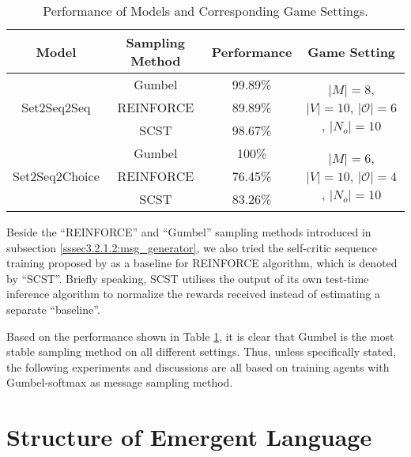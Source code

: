 \begin{table}[!h]
    \centering
    \begin{tabular}{|c|c|c|c|}
        \hline
        Model                           & Sampling Method & Performance & Game Setting      \\ \hline
        \multirow{3}{*}{Set2Seq2Seq}    & Gumbel          & 99.89\%     & \multirow{3}{1.5in}{$|M|=8$, $|V|=10$, $|\mathcal{O}|=6$, $|N_{o}|=10$} \\ \cline{2-3}
                                        & REINFORCE       & 89.89\%     &                   \\ \cline{2-3}
                                        & SCST            & 98.67\%     &                   \\ \hline
        \multirow{3}{*}{Set2Seq2Choice} & Gumbel          & 100\%       & \multirow{3}{1.5in}{$|M|=6$, $|V|=10$, $|\mathcal{O}|=4$, $|N_{o}|=10$} \\ \cline{2-3}
                                        & REINFORCE       & 76.45\%     &                   \\ \cline{2-3}
                                        & SCST            & 83.26\%     &                   \\ \hline
        \end{tabular}
    \caption{Performance of Models and Corresponding Game Settings.}
    \label{tab4.1:game_performance}
\end{table}

Beside the ``REINFORCE'' and ``Gumbel'' sampling methods introduced in subsection \ref{sssec3.2.1.2:msg_generator}, we also tried the self-critic sequence training proposed by \cite{rennie2017self} as a baseline for REINFORCE algorithm, which is denoted by ``SCST''. Briefly speaking, SCST utilises the output of its own test-time inference algorithm to normalize the rewards received instead of estimating a separate “baseline”.

Based on the performance shown in Table \ref{tab4.1:game_performance}, it is clear that Gumbel is the most stable sampling method on all different settings. Thus, unless specifically stated, the following experiments and discussions are all based on training agents with Gumbel-softmax as message sampling method.


\section{Structure of Emergent Language}
\label{sec4.2:structure_emergent_lan}

